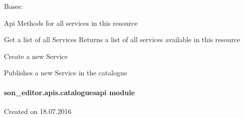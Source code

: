 \documentclass[letterpaper,10pt,english]{sphinxmanual}
\begin{document}

\begin{fulllineitems}
\label{_source/son_editor.apis:son_editor.apis.catalogue_servicesapi.Services}
Bases: 

Api Methods for all services in this resource

\begin{fulllineitems}
\label{_source/son_editor.apis:son_editor.apis.catalogue_servicesapi.Services.get}
Get a list of all Services
Returns a list of all services available in this resource

\end{fulllineitems}


\begin{fulllineitems}
\label{_source/son_editor.apis:son_editor.apis.catalogue_servicesapi.Services.methods}
\end{fulllineitems}


\begin{fulllineitems}
\label{_source/son_editor.apis:son_editor.apis.catalogue_servicesapi.Services.post}
Create a new Service

Publishes a new Service in the catalogue

\end{fulllineitems}


\end{fulllineitems}



\paragraph{son\_editor.apis.cataloguesapi module}
\label{_source/son_editor.apis:son-editor-apis-cataloguesapi-module}\label{_source/son_editor.apis:module-son_editor.apis.cataloguesapi}
Created on 18.07.2016
\end{document}
